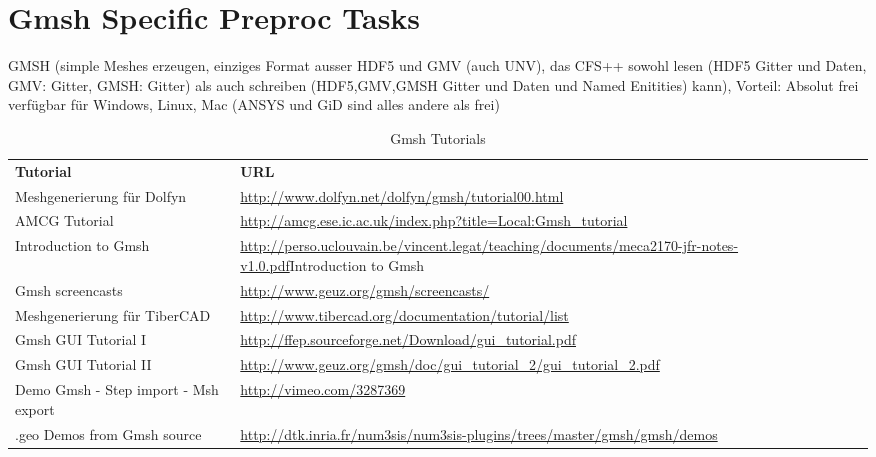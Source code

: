 \section{Gmsh Specific Preproc Tasks}
\label{sec:gmsh_pre}


GMSH   \cite{Geuzaine2009,GmshWebSite,  Gmsh2008}  (simple   Meshes  erzeugen,
einziges Format ausser  HDF5 und GMV (auch UNV), das  CFS++ sowohl lesen (HDF5
Gitter und Daten, GMV: Gitter, GMSH: Gitter) als auch schreiben (HDF5,GMV,GMSH
Gitter und Daten  und Named Enitities) kann), Vorteil:  Absolut frei verfügbar
für Windows, Linux, Mac (ANSYS und GiD sind alles andere als frei)

\begin{table}[tb]
\centering
\begin{minipage}{18cc}\caption{Gmsh Tutorials}
\label{tab:tablelabel}
\end{minipage}
\par\medskip\noindent
\begin{tabular}{ll}
  \toprule
  {\bf Tutorial} & {\bf URL} \\ \otoprule
  Meshgenerierung für Dolfyn & \leavevmode \url{http://www.dolfyn.net/dolfyn/gmsh/tutorial00.html} \\
  AMCG Tutorial & \leavevmode \url{http://amcg.ese.ic.ac.uk/index.php?title=Local:Gmsh_tutorial} \\
  Introduction to Gmsh & \url{http://perso.uclouvain.be/vincent.legat/teaching/documents/meca2170-jfr-notes-v1.0.pdf}{Introduction to Gmsh} \\
  Gmsh screencasts & \url{http://www.geuz.org/gmsh/screencasts/} \\
  Meshgenerierung für TiberCAD & \url{http://www.tibercad.org/documentation/tutorial/list} \\
  Gmsh GUI Tutorial I & \url{http://ffep.sourceforge.net/Download/gui\_tutorial.pdf}\\
  Gmsh GUI Tutorial II & \url{http://www.geuz.org/gmsh/doc/gui\_tutorial\_2/gui\_tutorial\_2.pdf}\\
  Demo Gmsh - Step import - Msh export & \url{http://vimeo.com/3287369}\\
  .geo Demos from Gmsh source & \url{http://dtk.inria.fr/num3sis/num3sis-plugins/trees/master/gmsh/gmsh/demos}\\
  \bottomrule
\end{tabular} 
\end{table}

